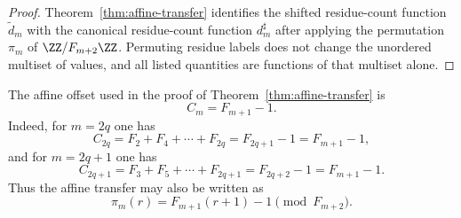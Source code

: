 \begin{proof}
Theorem~\ref{thm:affine-transfer} identifies the shifted residue-count
function $\widetilde d_m$ with the canonical residue-count function
$d_m^\sharp$ after applying the permutation $\pi_m$ of
$\ZZ/F_{m+2}\ZZ$.  Permuting residue labels does not change the unordered
multiset of values, and all listed quantities are functions of that multiset
alone.
\end{proof}

\begin{remark}
The affine offset used in the proof of Theorem~\ref{thm:affine-transfer} is
\[
C_m=F_{m+1}-1.
\]
Indeed, for $m=2q$ one has
\[
C_{2q}=F_2+F_4+\cdots+F_{2q}=F_{2q+1}-1=F_{m+1}-1,
\]
and for $m=2q+1$ one has
\[
C_{2q+1}=F_3+F_5+\cdots+F_{2q+1}=F_{2q+2}-1=F_{m+1}-1.
\]
Thus the affine transfer may also be written as
\[
\pi_m(r)=F_{m+1}(r+1)-1 \pmod{F_{m+2}}.
\]
\end{remark}


